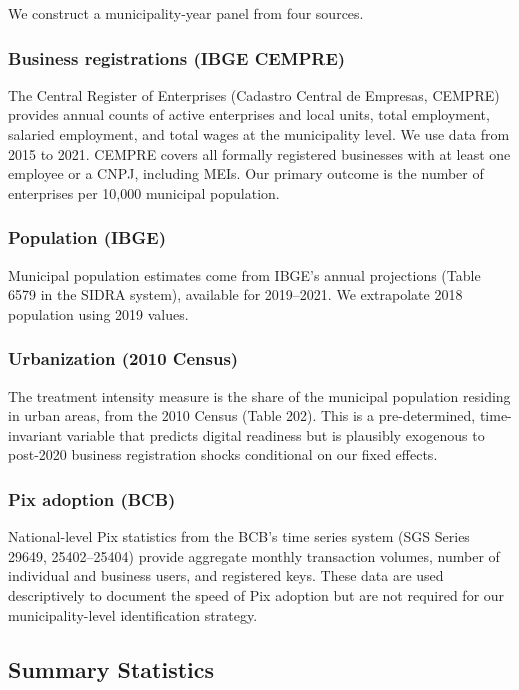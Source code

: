 \documentclass[12pt]{article}
\begin{document}
We construct a municipality-year panel from four sources.

\subsubsection*{Business registrations (IBGE CEMPRE)} The Central Register of Enterprises (Cadastro Central de Empresas, CEMPRE) provides annual counts of active enterprises and local units, total employment, salaried employment, and total wages at the municipality level. We use data from 2015 to 2021. CEMPRE covers all formally registered businesses with at least one employee or a CNPJ, including MEIs. Our primary outcome is the number of enterprises per 10,000 municipal population.

\subsubsection*{Population (IBGE)} Municipal population estimates come from IBGE's annual projections (Table 6579 in the SIDRA system), available for 2019--2021. We extrapolate 2018 population using 2019 values.

\subsubsection*{Urbanization (2010 Census)} The treatment intensity measure is the share of the municipal population residing in urban areas, from the 2010 Census (Table 202). This is a pre-determined, time-invariant variable that predicts digital readiness but is plausibly exogenous to post-2020 business registration shocks conditional on our fixed effects.

\subsubsection*{Pix adoption (BCB)} National-level Pix statistics from the BCB's time series system (SGS Series 29649, 25402--25404) provide aggregate monthly transaction volumes, number of individual and business users, and registered keys. These data are used descriptively to document the speed of Pix adoption but are not required for our municipality-level identification strategy.

\subsection{Summary Statistics}


\end{document}
